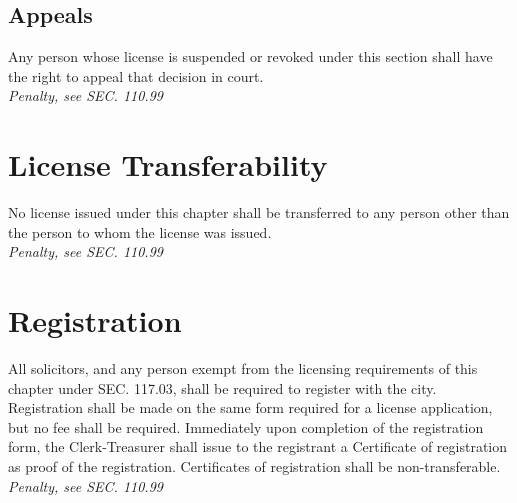 \subsection{Appeals}
Any person whose license is suspended or revoked under this section shall have the right to appeal that decision in court.\\
\emph{Penalty, see SEC. 110.99}
\section{License Transferability}
No license issued under this chapter shall be transferred to any person other than the person to whom the license was issued.\\
\emph{Penalty, see SEC. 110.99}
\section{Registration}
All solicitors, and any person exempt from the licensing requirements of this chapter under SEC. 117.03, shall be required to register with the city. Registration shall be made on the same form required for a license application, but no fee shall be required. Immediately upon completion of the registration form, the Clerk-Treasurer shall issue to the registrant a Certificate of registration as proof of the registration. Certificates of registration shall be non-transferable.\\
\emph{Penalty, see SEC. 110.99}
